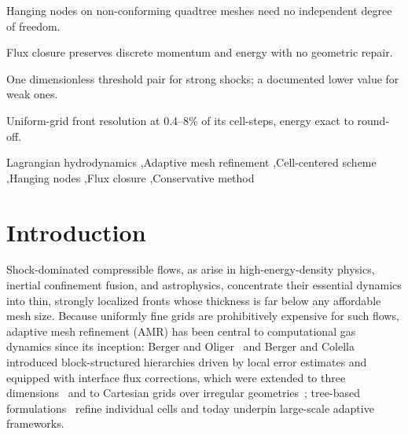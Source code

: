 \documentclass[a4paper]{cas-sc}
\begin{document}
\begin{highlights}
\item Hanging nodes on non-conforming quadtree meshes need no independent degree of freedom.
\item Flux closure preserves discrete momentum and energy with no geometric repair.
\item One dimensionless threshold pair for strong shocks; a documented lower value for weak ones.
\item Uniform-grid front resolution at 0.4--8\% of its cell-steps, energy exact to round-off.
\end{highlights}

\begin{keywords}
Lagrangian hydrodynamics \sep Adaptive mesh refinement \sep Cell-centered scheme \sep Hanging nodes \sep Flux closure \sep Conservative method
\end{keywords}

\maketitle

\section{Introduction}
\label{sec:introduction}

Shock-dominated compressible flows, as arise in high-energy-density physics, inertial confinement fusion, and astrophysics, concentrate their essential dynamics into thin, strongly localized fronts whose thickness is far below any affordable mesh size. Because uniformly fine grids are prohibitively expensive for such flows, adaptive mesh refinement (AMR) has been central to computational gas dynamics since its inception: Berger and Oliger~\cite{berger1984adaptive} and Berger and Colella~\cite{berger1989local} introduced block-structured hierarchies driven by local error estimates and equipped with interface flux corrections, which were extended to three dimensions~\cite{bell1994three} and to Cartesian grids over irregular geometries~\cite{pember1995adaptive}; tree-based formulations~\cite{khokhlov1998fully,burstedde2011p4est} refine individual cells and today underpin large-scale adaptive frameworks.
\end{document}
